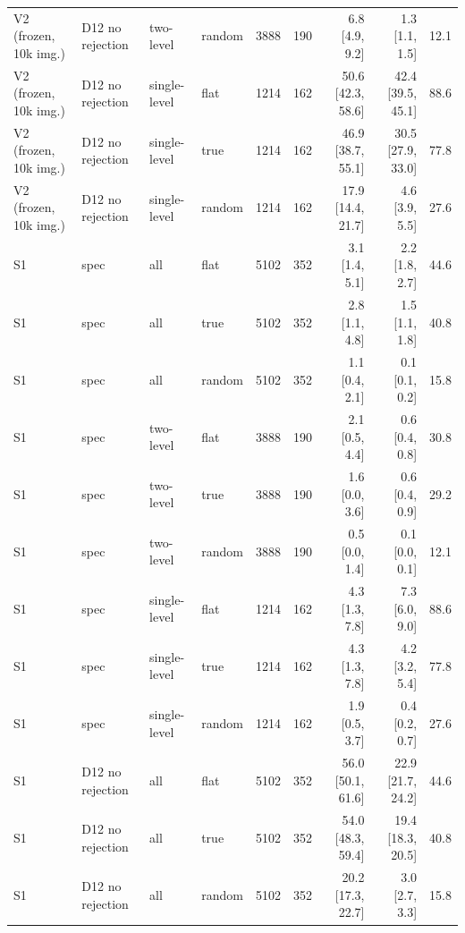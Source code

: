\begin{tabular}{llllrrrrr}
V2 (frozen, 10k img.) & D12 no rejection & two-level & random & 3888 & 190 & 6.8 \scriptsize{[4.9, 9.2]} & 1.3 \scriptsize{[1.1, 1.5]} & 12.1 \\
V2 (frozen, 10k img.) & D12 no rejection & single-level & flat & 1214 & 162 & 50.6 \scriptsize{[42.3, 58.6]} & 42.4 \scriptsize{[39.5, 45.1]} & 88.6 \\
V2 (frozen, 10k img.) & D12 no rejection & single-level & true & 1214 & 162 & 46.9 \scriptsize{[38.7, 55.1]} & 30.5 \scriptsize{[27.9, 33.0]} & 77.8 \\
V2 (frozen, 10k img.) & D12 no rejection & single-level & random & 1214 & 162 & 17.9 \scriptsize{[14.4, 21.7]} & 4.6 \scriptsize{[3.9, 5.5]} & 27.6 \\
\midrule
S1 & spec & all & flat & 5102 & 352 & 3.1 \scriptsize{[1.4, 5.1]} & 2.2 \scriptsize{[1.8, 2.7]} & 44.6 \\
S1 & spec & all & true & 5102 & 352 & 2.8 \scriptsize{[1.1, 4.8]} & 1.5 \scriptsize{[1.1, 1.8]} & 40.8 \\
S1 & spec & all & random & 5102 & 352 & 1.1 \scriptsize{[0.4, 2.1]} & 0.1 \scriptsize{[0.1, 0.2]} & 15.8 \\
S1 & spec & two-level & flat & 3888 & 190 & 2.1 \scriptsize{[0.5, 4.4]} & 0.6 \scriptsize{[0.4, 0.8]} & 30.8 \\
S1 & spec & two-level & true & 3888 & 190 & 1.6 \scriptsize{[0.0, 3.6]} & 0.6 \scriptsize{[0.4, 0.9]} & 29.2 \\
S1 & spec & two-level & random & 3888 & 190 & 0.5 \scriptsize{[0.0, 1.4]} & 0.1 \scriptsize{[0.0, 0.1]} & 12.1 \\
S1 & spec & single-level & flat & 1214 & 162 & 4.3 \scriptsize{[1.3, 7.8]} & 7.3 \scriptsize{[6.0, 9.0]} & 88.6 \\
S1 & spec & single-level & true & 1214 & 162 & 4.3 \scriptsize{[1.3, 7.8]} & 4.2 \scriptsize{[3.2, 5.4]} & 77.8 \\
S1 & spec & single-level & random & 1214 & 162 & 1.9 \scriptsize{[0.5, 3.7]} & 0.4 \scriptsize{[0.2, 0.7]} & 27.6 \\
\midrule
S1 & D12 no rejection & all & flat & 5102 & 352 & 56.0 \scriptsize{[50.1, 61.6]} & 22.9 \scriptsize{[21.7, 24.2]} & 44.6 \\
S1 & D12 no rejection & all & true & 5102 & 352 & 54.0 \scriptsize{[48.3, 59.4]} & 19.4 \scriptsize{[18.3, 20.5]} & 40.8 \\
S1 & D12 no rejection & all & random & 5102 & 352 & 20.2 \scriptsize{[17.3, 22.7]} & 3.0 \scriptsize{[2.7, 3.3]} & 15.8 \\

\end{tabular}
